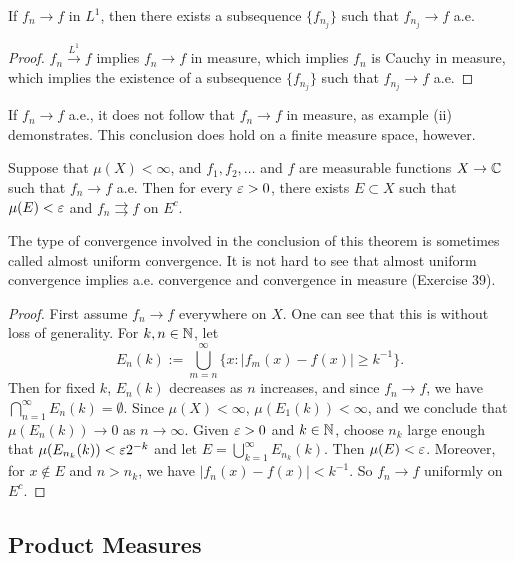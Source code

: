 \documentclass[12pt]{article} %
\begin{document}
\begin{corollary}
    If $f_n \to f$ in $L^1$, then there exists a subsequence $\{f_{n_j}\}$ such that $f_{n_j} \to f$ a.e.
\end{corollary}

\begin{proof}
    $f_n \overset{L^1}{\to} f$ implies $f_n \to f$ in measure, which implies $f_n$ is Cauchy in measure, which implies the existence of a subsequence $\{f_{n_j}\}$ such that $f_{n_j} \to f$ a.e.
\end{proof}

If $f_n \to f$ a.e., it does not follow that $f_n \to f$ in measure, as example (ii) demonstrates. This conclusion does hold on a finite measure space, however.

\begin{theorem}[Egoroff]
    Suppose that $\mu(X) < \infty$, and $f_1, f_2, \ldots$ and $f$ are measurable functions $X \to \mathbb{C}$ such that $f_n \to f$ a.e. Then for every $\varepsilon > 0$, there exists $E \subset X$ such that $\mu(E) < \varepsilon$ and $f_n \rightrightarrows f$ on $E^c$.
\end{theorem}

\noindent The type of convergence involved in the conclusion of this theorem is sometimes called almost uniform convergence. It is not hard to see that almost uniform convergence implies a.e. convergence and convergence in measure (Exercise 39).

\begin{proof}
    First assume $f_n \to f$ everywhere on $X$. One can see that this is without loss of generality. For $k, n \in \mathbb{N}$, let \[E_n(k) := \bigcup_{m=n}^{\infty} \{x : |f_m(x) - f(x)| \geq k^{-1}\}.\]
    Then for fixed $k$, $E_n(k)$ decreases as $n$ increases, and since $f_n \to f$, we have $\bigcap_{n=1}^{\infty} E_n(k) = \emptyset$. Since $\mu(X) < \infty$, $\mu(E_1(k)) < \infty$, and we conclude that $\mu(E_n(k)) \to 0$ as $n \to \infty$. Given $\varepsilon > 0$ and $k \in \mathbb{N}$, choose $n_k$ large enough that $\mu(E_{n_k}(k)) < \varepsilon 2^{-k}$ and let $E = \bigcup_{k=1}^{\infty} E_{n_k}(k)$. Then $\mu(E) < \varepsilon$. Moreover, for $x \notin E$ and $n > n_k$, we have $|f_n(x) - f(x)| < k^{-1}$. So $f_n \to f$ uniformly on $E^c$.
\end{proof}

\subsection{Product Measures}
\end{document}
